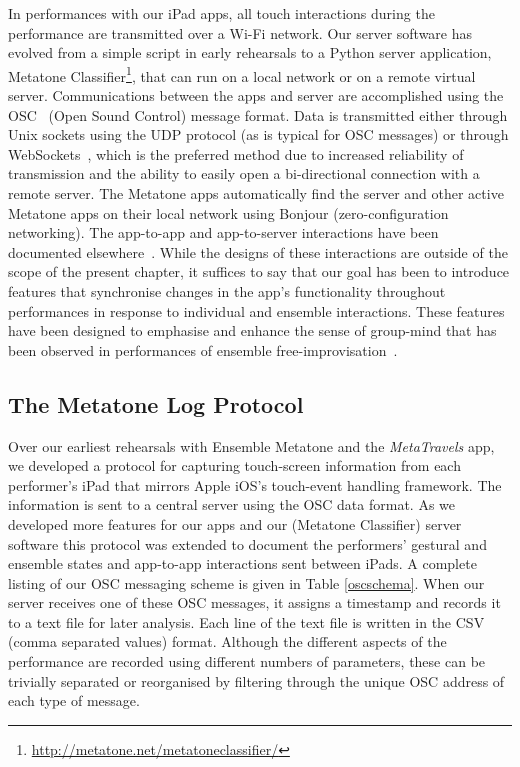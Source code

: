 \documentclass[graybox]{svmult}
\begin{document}
In performances with our iPad apps, all touch interactions during the
performance are transmitted over a Wi-Fi network. Our server software
has evolved from a simple script in early rehearsals to a Python
server application, Metatone
Classifier\footnote{\url{http://metatone.net/metatoneclassifier/}},
that can run on a local network or on a remote virtual server.
Communications between the apps and server are accomplished using the
OSC~\cite{osc-nime2009} (Open Sound Control) message format. Data is
transmitted either through Unix sockets using the UDP protocol (as is
typical for OSC messages) or through WebSockets~\cite{Fette:2011eu},
which is the preferred method due to increased reliability of
transmission and the ability to easily open a bi-directional
connection with a remote server. The Metatone apps automatically find
the server and other active Metatone apps on their local network using
Bonjour (zero-configuration networking). The app-to-app and app-to-server
interactions have 
been documented elsewhere~\cite{Martin:2015mz,Martin:2015jk}. While
the designs of these interactions are outside of the scope of the
present chapter, it suffices to say that our goal has been to
introduce features that synchronise changes in the app's functionality
throughout performances in response to individual and ensemble
interactions. These features have been designed to emphasise and enhance the
sense of group-mind that has been observed in performances of ensemble
free-improvisation~\cite{Borgo:2006fv}. 

\subsection{The Metatone Log Protocol}
\label{subsec:metatone-log}

Over our earliest rehearsals with Ensemble Metatone and the
\emph{MetaTravels} app, we developed a protocol for capturing
touch-screen information from each performer's iPad that mirrors Apple
iOS's touch-event handling framework. The information is sent to a
central server using the OSC data format. As we developed more
features for our apps and our (Metatone Classifier) server software
this protocol was extended to document the performers' gestural and
ensemble states and app-to-app interactions sent between iPads. A
complete listing of our OSC messaging scheme is given in Table
\ref{oscschema}. When our server receives one of these OSC messages,
it assigns a timestamp and records it to a text file for later
analysis. Each line of the text file is written in the CSV (comma
separated values) format. Although the different aspects of the
performance are recorded using different numbers of parameters, these
can be trivially separated or reorganised by filtering through the
unique OSC address of each type of message.
\end{document}
